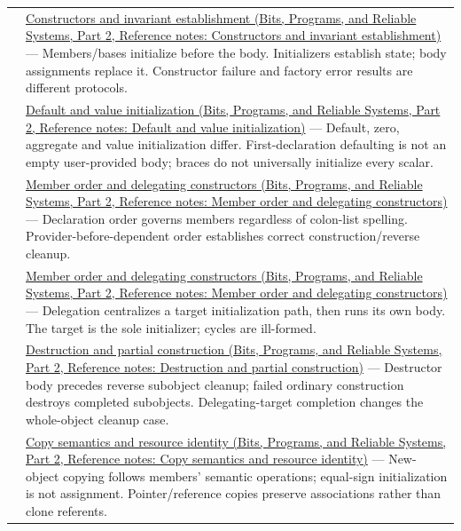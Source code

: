 {\begin{longtable}[]{@{}
  >{\raggedright\arraybackslash}p{}
  >{\raggedright\arraybackslash}p{}@{}}
132 & \href{../01-Bits-Programs-and-Reliable-Systems-P02/main.pdf\#appendix-7f8ec83d0886}{Constructors and invariant establishment (Bits, Programs, and Reliable Systems, Part 2, Reference notes: Constructors and invariant establishment)} --- Members/bases initialize before the body. Initializers establish state; body assignments replace it. Constructor failure and factory error results are different protocols. \\
133 & \href{../01-Bits-Programs-and-Reliable-Systems-P02/main.pdf\#appendix-ba8c1a9fe03f}{Default and value initialization (Bits, Programs, and Reliable Systems, Part 2, Reference notes: Default and value initialization)} --- Default, zero, aggregate and value initialization differ. First-declaration defaulting is not an empty user-provided body; braces do not universally initialize every scalar. \\
134 & \href{../01-Bits-Programs-and-Reliable-Systems-P02/main.pdf\#appendix-3cb49709605a}{Member order and delegating constructors (Bits, Programs, and Reliable Systems, Part 2, Reference notes: Member order and delegating constructors)} --- Declaration order governs members regardless of colon-list spelling. Provider-before-dependent order establishes correct construction/reverse cleanup. \\
135 & \href{../01-Bits-Programs-and-Reliable-Systems-P02/main.pdf\#appendix-3cb49709605a}{Member order and delegating constructors (Bits, Programs, and Reliable Systems, Part 2, Reference notes: Member order and delegating constructors)} --- Delegation centralizes a target initialization path, then runs its own body. The target is the sole initializer; cycles are ill-formed. \\
136 & \href{../01-Bits-Programs-and-Reliable-Systems-P02/main.pdf\#appendix-9bfe377cef7a}{Destruction and partial construction (Bits, Programs, and Reliable Systems, Part 2, Reference notes: Destruction and partial construction)} --- Destructor body precedes reverse subobject cleanup; failed ordinary construction destroys completed subobjects. Delegating-target completion changes the whole-object cleanup case. \\
137 & \href{../01-Bits-Programs-and-Reliable-Systems-P02/main.pdf\#appendix-1340cd1ce582}{Copy semantics and resource identity (Bits, Programs, and Reliable Systems, Part 2, Reference notes: Copy semantics and resource identity)} --- New-object copying follows members' semantic operations; equal-sign initialization is not assignment. Pointer/reference copies preserve associations rather than clone referents. \\

\end{longtable}}
